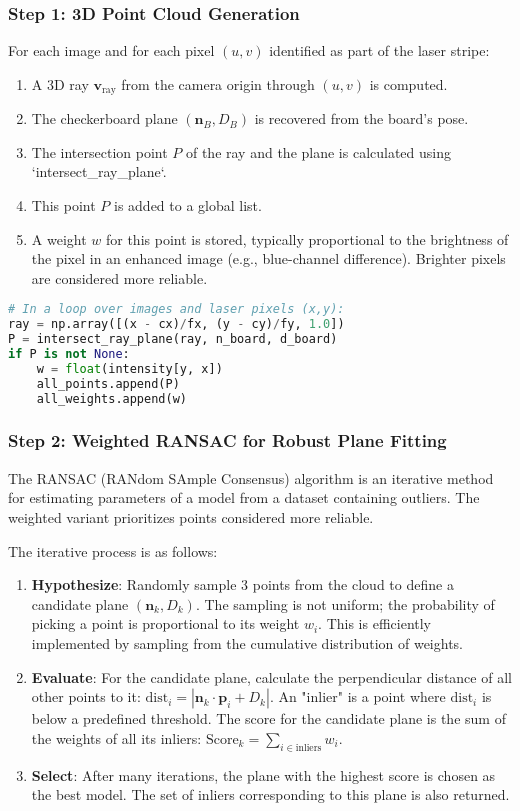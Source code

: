 \documentclass{article}
\begin{document}
\subsubsection{Step 1: 3D Point Cloud Generation}
For each image and for each pixel $(u,v)$ identified as part of the laser stripe:
\begin{enumerate}
    \item A 3D ray $\mathbf{v}_{\text{ray}}$ from the camera origin through $(u,v)$ is computed.
    \item The checkerboard plane $(\mathbf{n}_B, D_B)$ is recovered from the board's pose.
    \item The intersection point $P$ of the ray and the plane is calculated using `intersect\_ray\_plane`.
    \item This point $P$ is added to a global list.
    \item A weight $w$ for this point is stored, typically proportional to the brightness of the pixel in an enhanced image (e.g., blue-channel difference). Brighter pixels are considered more reliable.
\end{enumerate}
\begin{lstlisting}[language=Python]
# In a loop over images and laser pixels (x,y):
ray = np.array([(x - cx)/fx, (y - cy)/fy, 1.0])
P = intersect_ray_plane(ray, n_board, d_board)
if P is not None:
    w = float(intensity[y, x])
    all_points.append(P)
    all_weights.append(w)
\end{lstlisting}

\subsubsection{Step 2: Weighted RANSAC for Robust Plane Fitting}
The RANSAC (RANdom SAmple Consensus) algorithm is an iterative method for estimating parameters of a model from a dataset containing outliers. The weighted variant prioritizes points considered more reliable.

The iterative process is as follows:
\begin{enumerate}
    \item \textbf{Hypothesize}: Randomly sample 3 points from the cloud to define a candidate plane $(\mathbf{n}_k, D_k)$. The sampling is not uniform; the probability of picking a point is proportional to its weight $w_i$. This is efficiently implemented by sampling from the cumulative distribution of weights.
    \item \textbf{Evaluate}: For the candidate plane, calculate the perpendicular distance of all other points to it: $\text{dist}_i = |\mathbf{n}_k \cdot \mathbf{p}_i + D_k|$. An "inlier" is a point where $\text{dist}_i$ is below a predefined threshold. The score for the candidate plane is the sum of the weights of all its inliers: $\text{Score}_k = \sum_{i \in \text{inliers}} w_i$.
    \item \textbf{Select}: After many iterations, the plane with the highest score is chosen as the best model. The set of inliers corresponding to this plane is also returned.
\end{enumerate}
\end{document}
